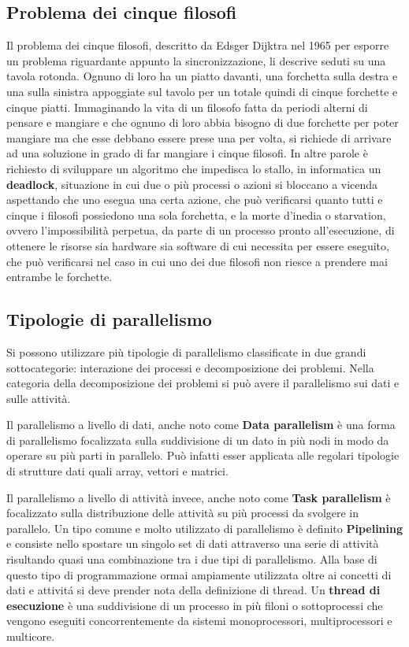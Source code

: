 {\subsection{Problema dei cinque filosofi}
Il problema dei cinque filosofi, descritto da Edsger Dijktra nel 1965 per esporre un problema riguardante appunto la sincronizzazione, li descrive seduti su una tavola rotonda. Ognuno di loro ha un piatto davanti, una forchetta sulla destra e una sulla sinistra appoggiate sul tavolo per un totale quindi di cinque forchette e cinque piatti. Immaginando la vita di un filosofo fatta da periodi alterni di pensare e mangiare e che ognuno di loro abbia bisogno di due forchette per poter mangiare ma che esse debbano essere prese una per volta, si richiede di arrivare ad una soluzione in grado di far mangiare i cinque filosofi. In altre parole \`e richiesto di sviluppare un algoritmo che impedisca lo stallo, in informatica un \textbf{deadlock}, situazione in cui due o pi\`u processi o azioni si bloccano a vicenda aspettando che uno esegua una certa azione, che pu\`o verificarsi quanto tutti e cinque i filosofi possiedono una sola forchetta, e la morte d'inedia o starvation, ovvero l'impossibilit\`a perpetua, da parte di un processo pronto all'esecuzione, di ottenere le risorse sia hardware sia software di cui necessita per essere eseguito, che pu\`o verificarsi nel caso in cui uno dei due filosofi non riesce a prendere mai entrambe le forchette.
\subsection{Tipologie di parallelismo}
Si possono utilizzare pi\`u tipologie di parallelismo classificate in due grandi sottocategorie: interazione dei processi e decomposizione dei problemi. Nella categoria della decomposizione dei problemi si pu\`o avere il parallelismo sui dati e  sulle attivit\`a.

Il parallelismo a livello di dati, anche noto come \textbf{Data parallelism} \`e una forma di parallelismo focalizzata sulla suddivisione di un dato in pi\`u nodi in modo da operare su pi\`u parti in parallelo. Pu\`o infatti esser applicata alle regolari tipologie di strutture dati quali array, vettori e matrici.

Il parallelismo a livello di attivit\`a invece, anche noto come \textbf{Task parallelism} \`e focalizzato sulla distribuzione delle attivit\`a su pi\`u processi da svolgere in parallelo. Un tipo comune e molto utilizzato di parallelismo \`e definito \textbf{Pipelining} e consiste nello spostare un singolo set di dati attraverso una serie di attivit\`a risultando quasi una combinazione tra i due tipi di parallelismo. Alla base di questo tipo di programmazione ormai ampiamente utilizzata oltre ai concetti di dati e attivit\'a si deve prender nota della definizione di thread. Un \textbf{thread di esecuzione} \`e una suddivisione di un processo in pi\`u filoni o sottoprocessi che vengono eseguiti concorrentemente da sistemi monoprocessori, multiprocessori e multicore.
}
